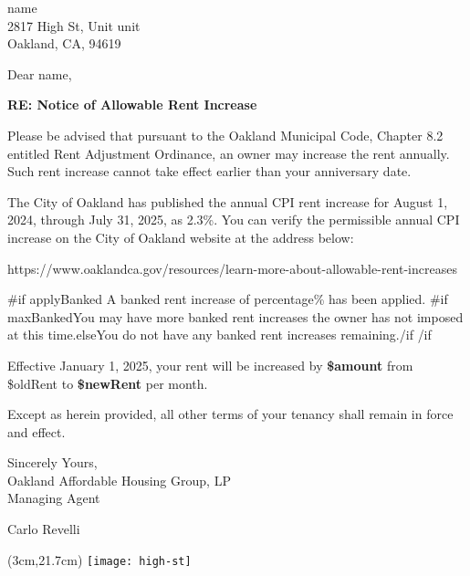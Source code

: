 \documentclass[a4paper,12pt]{letter}
\date{} %
\begin{document}
\begin{letter}{%
{{name}} \\
2817 High St, Unit {{ unit }} \\
Oakland, CA, 94619
}



\opening{Dear {{name}},}

\textbf{RE: Notice of Allowable Rent Increase}

Please be advised that pursuant to the Oakland Municipal Code, Chapter 8.2 entitled Rent Adjustment Ordinance, an owner may increase the rent annually. Such rent increase cannot take effect earlier than your anniversary date.

The City of Oakland has published the annual CPI rent increase for August 1, 2024, through July 31, 2025, as 2.3\%. You can verify the permissible annual CPI increase on the City of Oakland website at the address below:

https://www.oaklandca.gov/resources/learn-more-about-allowable-rent-increases

{{#if applyBanked}}
A banked rent increase of {{percentage}}\% has been applied. {{#if maxBanked}}You may have more banked rent increases the owner has not imposed at this time.{{else}}You do not have any banked rent increases remaining.{{/if}}
{{/if}}

Effective January 1, 2025, your rent will be increased by \textbf{\${{amount}} }from \${{oldRent}} to \textbf{\${{newRent}} }per month.

Except as herein provided, all other terms of your tenancy shall remain in force and effect.

\vspace{0.8cm}

Sincerely Yours, \\
Oakland Affordable Housing Group, LP\\
Managing Agent\\

\vspace{0.03cm}

\noindent
{\Huge\calligra Carlo Revelli} %

\vspace{1cm}

\begin{textblock*}{\textwidth}(3cm,21.7cm) %
    \centering
    \texttt{[image: high-st]} %
\end{textblock*}

\end{letter}
\end{document}
